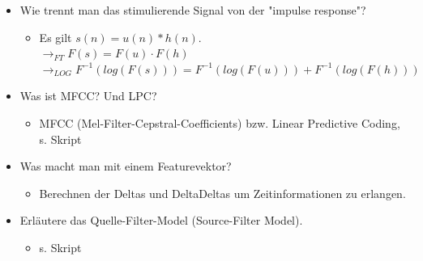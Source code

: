 \begin{itemize}
\begin{itemize}
\end{itemize}
\item Wie trennt man das stimulierende Signal von der "impulse response"?
\begin{itemize}
\item Es gilt $s(n) = u(n) *  h(n)$. \\ $\rightarrow_{FT} F(s) = F(u) \cdot F(h)$ \\ $\rightarrow_{LOG} F^{-1}(log(F(s))) = F^{-1}(log(F(u))) + F^{-1}(log(F(h)))$
\end{itemize}
\item Was ist MFCC? Und LPC?
\begin{itemize}
\item MFCC (Mel-Filter-Cepstral-Coefficients) bzw. Linear Predictive Coding, s. Skript
\end{itemize}
\item Was macht man mit einem Featurevektor? 
\begin{itemize}
\item Berechnen der Deltas und DeltaDeltas um Zeitinformationen zu erlangen.
\end{itemize}
\item Erläutere das Quelle-Filter-Model (Source-Filter Model). 
\begin{itemize}
\item s. Skript
\end{itemize}
\end{itemize}


